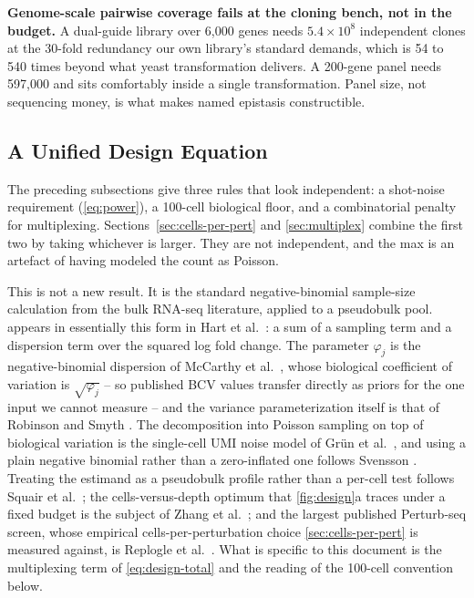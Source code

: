 \begin{keybox}
\textbf{Genome-scale pairwise coverage fails at the cloning bench, not in the
budget.} A dual-guide library over 6{,}000 genes needs $5.4\times10^{8}$
independent clones at the 30-fold redundancy our own library's standard demands,
which is 54 to 540 times beyond what yeast transformation delivers. A 200-gene
panel needs 597{,}000 and sits comfortably inside a single transformation. Panel
size, not sequencing money, is what makes named epistasis constructible.
\end{keybox}

\subsection{A Unified Design Equation}
\label{sec:design-equation}

The preceding subsections give three rules that look independent: a shot-noise
requirement (\cref{eq:power}), a 100-cell biological floor, and a combinatorial
penalty for multiplexing. Sections~\ref{sec:cells-per-pert} and \ref{sec:multiplex}
combine the first two by taking whichever is larger. They are not independent, and
the max is an artefact of having modeled the count as Poisson.

This is not a new result. It is the standard negative-binomial sample-size
calculation from the bulk RNA-seq literature, applied to a pseudobulk pool.
 appears in essentially this form in Hart et
al.\ \citep{hartCalculatingSampleSize2013}: a sum of a sampling term and a
dispersion term over the squared log fold change. The parameter $\varphi_j$ is
the negative-binomial dispersion of McCarthy et
al.\ \citep{mccarthyDifferentialExpressionAnalysis2012}, whose biological
coefficient of variation is $\sqrt{\varphi_j}$ -- so published BCV values
transfer directly as priors for the one input we cannot measure -- and the
variance parameterization itself is that of Robinson and
Smyth \citep{robinsonSmallsampleEstimationNegative2008}. The decomposition into
Poisson sampling on top of biological variation is the single-cell UMI noise model
of Gr\"un et al.\ \citep{grunValidationNoiseModels2014}, and using a plain
negative binomial rather than a zero-inflated one follows
Svensson \citep{svenssonDropletScRNAseqNot2020}. Treating the estimand as a
pseudobulk profile rather than a per-cell test follows Squair et
al.\ \citep{squairConfrontingFalseDiscoveries2021}; the cells-versus-depth optimum
that \cref{fig:design}a traces under a fixed budget is the subject of Zhang et
al.\ \citep{zhangDeterminingSequencingDepth2020}; and the largest published
Perturb-seq screen, whose empirical cells-per-perturbation choice
\cref{sec:cells-per-pert} is measured against, is Replogle et
al.\ \citep{replogleMappingInformationrichGenotypephenotype2022}. What is specific
to this document is the multiplexing term of \cref{eq:design-total} and the
reading of the 100-cell convention below.

